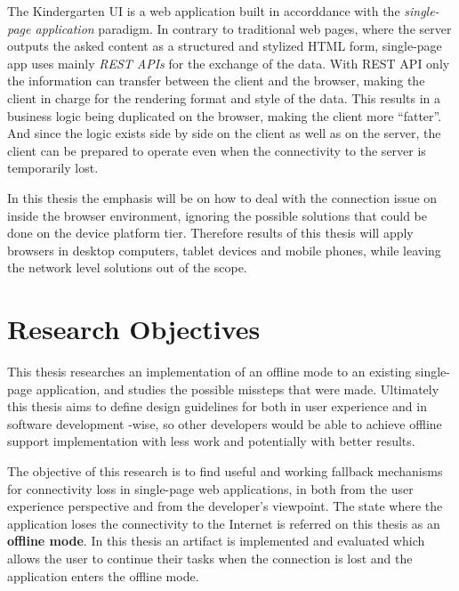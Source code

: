 The Kindergarten UI is a web application built in accorddance with the \textit{single-page application} paradigm. In contrary to traditional web pages, where the server outputs the asked content as a structured and stylized HTML form, single-page app uses mainly \textit{REST APIs} for the exchange of the data. With REST API only the information can transfer between the client and the browser, making the client in charge for the rendering format and style of the data. This results in a business logic being duplicated on the browser, making the client more ``fatter''. And since the logic exists side by side on the client as well as on the server, the client can be prepared to operate even when the connectivity to the server is temporarily lost.

In this thesis the emphasis will be on how to deal with the connection issue on inside the browser environment, ignoring the possible solutions that could be done on the device platform tier. Therefore results of this thesis will apply browsers in desktop computers, tablet devices and mobile phones, while leaving the network level solutions out of the scope.






\section{Research Objectives}
This thesis researches an implementation of an offline mode to an existing single-page application, and studies the possible missteps that were made. Ultimately this thesis aims to define design guidelines for both in user experience and in software development -wise, so other developers would be able to achieve offline support implementation with less work and potentially with better results.

The objective of this research is to find useful and working fallback mechanisms for connectivity loss in single-page web applications, in both from the user experience perspective and from the developer's viewpoint. The state where the application loses the connectivity to the Internet is referred on this thesis as an \textbf{offline mode}. In this thesis an artifact is implemented and evaluated which allows the user to continue their tasks when the connection is lost and the application enters the offline mode.

